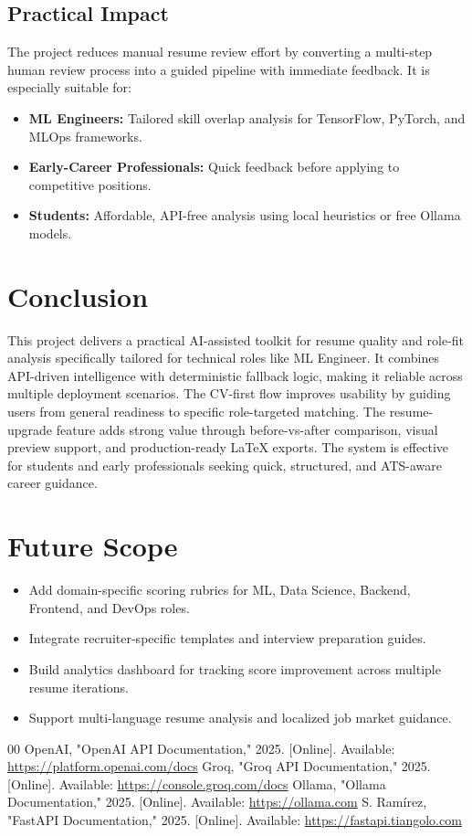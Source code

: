 \documentclass[conference]{IEEEtran}
\begin{document}
\subsection{Practical Impact}
The project reduces manual resume review effort by converting a multi-step human review process into a guided pipeline with immediate feedback. It is especially suitable for:
\begin{itemize}
    \item \textbf{ML Engineers:} Tailored skill overlap analysis for TensorFlow, PyTorch, and MLOps frameworks.
    \item \textbf{Early-Career Professionals:} Quick feedback before applying to competitive positions.
    \item \textbf{Students:} Affordable, API-free analysis using local heuristics or free Ollama models.
\end{itemize}

\section{Conclusion}
This project delivers a practical AI-assisted toolkit for resume quality and role-fit analysis specifically tailored for technical roles like ML Engineer. It combines API-driven intelligence with deterministic fallback logic, making it reliable across multiple deployment scenarios. The CV-first flow improves usability by guiding users from general readiness to specific role-targeted matching. The resume-upgrade feature adds strong value through before-vs-after comparison, visual preview support, and production-ready LaTeX exports. The system is effective for students and early professionals seeking quick, structured, and ATS-aware career guidance.

\section{Future Scope}
\begin{itemize}
    \item Add domain-specific scoring rubrics for ML, Data Science, Backend, Frontend, and DevOps roles.
    \item Integrate recruiter-specific templates and interview preparation guides.
    \item Build analytics dashboard for tracking score improvement across multiple resume iterations.
    \item Support multi-language resume analysis and localized job market guidance.
\end{itemize}

\begin{thebibliography}{00}
 OpenAI, "OpenAI API Documentation," 2025. [Online]. Available: \url{https://platform.openai.com/docs}
 Groq, "Groq API Documentation," 2025. [Online]. Available: \url{https://console.groq.com/docs}
 Ollama, "Ollama Documentation," 2025. [Online]. Available: \url{https://ollama.com}
 S. Ramírez, "FastAPI Documentation," 2025. [Online]. Available: \url{https://fastapi.tiangolo.com}
\end{thebibliography}
\end{document}
